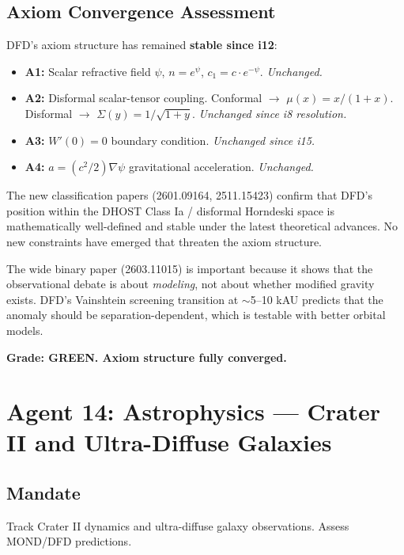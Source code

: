 \documentclass[11pt,a4paper]{article}
\begin{document}
\subsection{Axiom Convergence Assessment}

DFD's axiom structure has remained \textbf{stable since i12}:

\begin{itemize}
\item \textbf{A1:} Scalar refractive field $\psi$, $n = e^\psi$, $c_1 = c \cdot e^{-\psi}$. \emph{Unchanged.}
\item \textbf{A2:} Disformal scalar-tensor coupling. Conformal $\to$ $\mu(x) = x/(1+x)$. Disformal $\to$ $\Sigma(y) = 1/\sqrt{1+y}$. \emph{Unchanged since i8 resolution.}
\item \textbf{A3:} $W'(0) = 0$ boundary condition. \emph{Unchanged since i15.}
\item \textbf{A4:} $a = (c^2/2)\nabla\psi$ gravitational acceleration. \emph{Unchanged.}
\end{itemize}

The new classification papers (2601.09164, 2511.15423) confirm that DFD's position within the DHOST Class Ia / disformal Horndeski space is mathematically well-defined and stable under the latest theoretical advances. No new constraints have emerged that threaten the axiom structure.

The wide binary paper (2603.11015) is important because it shows that the observational debate is about \emph{modeling}, not about whether modified gravity exists. DFD's Vainshtein screening transition at $\sim$5--10 kAU predicts that the anomaly should be separation-dependent, which is testable with better orbital models.

\textbf{Grade: GREEN. Axiom structure fully converged.}

\section{Agent 14: Astrophysics --- Crater II and Ultra-Diffuse Galaxies}

\subsection{Mandate}
Track Crater II dynamics and ultra-diffuse galaxy observations. Assess MOND/DFD predictions.
\end{document}
